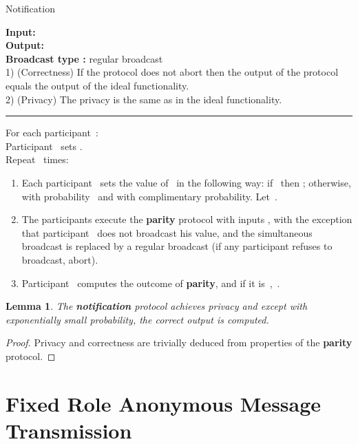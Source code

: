 \documentclass[11pt]{article}
\newtheorem{lemma}[theorem]{Lemma}
\begin{document}
\begin{protocol} \caption{Notification} \label{prot:notification}
{\bf Input:}  \\
{\bf Output:}  \\
{\bf Broadcast type :}  regular broadcast\\
1) (Correctness) If the protocol does not abort then the output of
the protocol
equals the output of the ideal functionality.   \\
2) (Privacy) The privacy is the same as in the ideal functionality.

\vspace{4pt} \hrule \vspace{4pt}


For each participant~:\\
\phantom{----}Participant~ sets .\\
\phantom{----}Repeat~ times:
\begin{enumerate}
\item Each participant~ sets the value of~ in the
following way: if~ then ; otherwise,  with
probability~ and  with complimentary
probability. Let~.
\item The participants execute the \textbf{parity} protocol with inputs
, with the exception that participant~ does
not broadcast his value, and the simultaneous broadcast is replaced
by a regular broadcast (if any participant refuses to broadcast,
abort).
\item Participant~ computes the outcome of \textbf{parity}, and if it is~, \,.
\end{enumerate}
\end{protocol}

\begin{lemma}
The \textbf{notification} protocol achieves privacy and except with
exponentially small probability, the correct output is computed.
\end{lemma}

\begin{proof}
Privacy and correctness are trivially deduced from properties of the
\textbf{parity} protocol.
\end{proof}

\section{Fixed Role Anonymous Message Transmission}
\label{sec:fr-anonymous-message}
\end{document}
